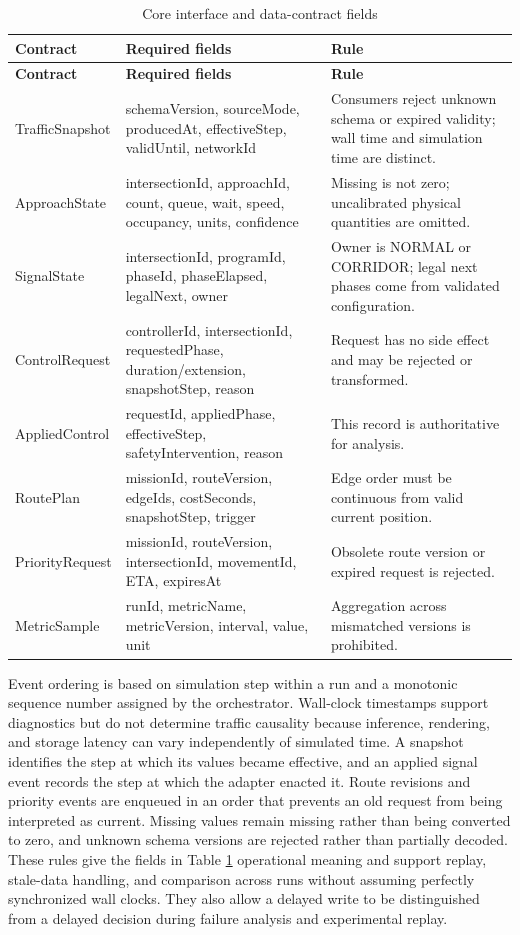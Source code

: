 \begin{longtable}{p{}p{}p{}}
\caption{Core interface and data-contract fields}\label{tab:contracts}\\
\toprule
\textbf{Contract} & \textbf{Required fields} & \textbf{Rule}\\
\midrule\endfirsthead
\toprule
\textbf{Contract} & \textbf{Required fields} & \textbf{Rule}\\
\midrule\endhead
TrafficSnapshot & schemaVersion, sourceMode, producedAt, effectiveStep, validUntil, networkId & Consumers reject unknown schema or expired validity; wall time and simulation time are distinct.\\
ApproachState & intersectionId, approachId, count, queue, wait, speed, occupancy, units, confidence & Missing is not zero; uncalibrated physical quantities are omitted.\\
SignalState & intersectionId, programId, phaseId, phaseElapsed, legalNext, owner & Owner is NORMAL or CORRIDOR; legal next phases come from validated configuration.\\
ControlRequest & controllerId, intersectionId, requestedPhase, duration/extension, snapshotStep, reason & Request has no side effect and may be rejected or transformed.\\
AppliedControl & requestId, appliedPhase, effectiveStep, safetyIntervention, reason & This record is authoritative for analysis.\\
RoutePlan & missionId, routeVersion, edgeIds, costSeconds, snapshotStep, trigger & Edge order must be continuous from valid current position.\\
PriorityRequest & missionId, routeVersion, intersectionId, movementId, ETA, expiresAt & Obsolete route version or expired request is rejected.\\
MetricSample & runId, metricName, metricVersion, interval, value, unit & Aggregation across mismatched versions is prohibited.\\
\bottomrule
\end{longtable}

Event ordering is based on simulation step within a run and a monotonic sequence number assigned by the orchestrator. Wall-clock timestamps support diagnostics but do not determine traffic causality because inference, rendering, and storage latency can vary independently of simulated time. A snapshot identifies the step at which its values became effective, and an applied signal event records the step at which the adapter enacted it. Route revisions and priority events are enqueued in an order that prevents an old request from being interpreted as current. Missing values remain missing rather than being converted to zero, and unknown schema versions are rejected rather than partially decoded. These rules give the fields in Table \ref{tab:contracts} operational meaning and support replay, stale-data handling, and comparison across runs without assuming perfectly synchronized wall clocks. They also allow a delayed write to be distinguished from a delayed decision during failure analysis and experimental replay.

